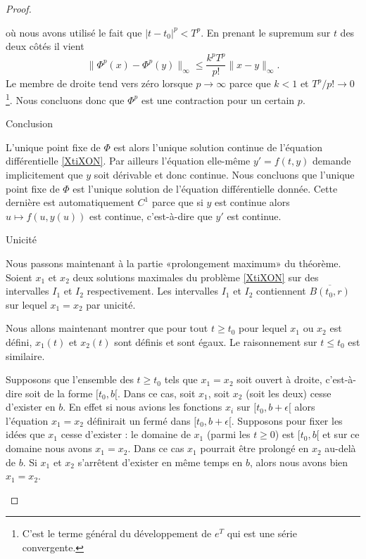 \begin{proof}
\begin{subproof}
\begin{equation}
		\end{equation}
		où nous avons utilisé le fait que \( | t-t_0 |^p<T^p\). En prenant le supremum sur \( t\) des deux côtés il vient
		\begin{equation}
			\| \Phi^p(x)-\Phi^p(y) \|_{\infty}\leq\frac{ k^pT^p }{ p! }\| x-y \|_{\infty}.
		\end{equation}
		Le membre de droite tend vers zéro lorsque \( p\to\infty\) parce que \( k<1\) et \( T^p/p!\to 0\)\footnote{C'est le terme général du développement de \(  e^{T}\) qui est une série convergente.}. Nous concluons donc que \( \Phi^p\) est une contraction pour un certain \( p\).

		\item[Conclusion]

		L'unique point fixe de \( \Phi\) est alors l'unique solution continue de l'équation différentielle \eqref{XtiXON}. Par ailleurs l'équation elle-même \( y'=f(t,y)\) demande implicitement que \( y\) soit dérivable et donc continue. Nous concluons que l'unique point fixe de \( \Phi\) est l'unique solution de l'équation différentielle donnée. Cette dernière est automatiquement \( C^1\) parce que si \( y\) est continue alors \( u\mapsto f(u,y(u))\) est continue, c'est-à-dire que \( y'\) est continue.

		\item[Unicité]

		Nous passons maintenant à la partie «prolongement maximum» du théorème. Soient \( x_1\) et \( x_2\) deux solutions maximales du problème \eqref{XtiXON} sur des intervalles \( I_1\) et \( I_2\) respectivement. Les intervalles \( I_1\) et \( I_2\) contiennent \( \overline{ B(t_0,r) }\) sur lequel \( x_1=x_2\) par unicité.

		Nous allons maintenant montrer que pour tout \( t\geq t_0\) pour lequel \( x_1\) ou \( x_2\) est défini, \( x_1(t)\) et \( x_2(t)\) sont définis et sont égaux. Le raisonnement sur \( t\leq t_0\) est similaire.

		Supposons que l'ensemble des \( t\geq t_0\) tels que \( x_1=x_2\) soit ouvert à droite, c'est-à-dire soit de la forme \( \mathopen[ t_0 ,b [\). Dans ce cas, soit \( x_1\), soit \( x_2\) (soit les deux) cesse d'exister en \( b\). En effet si nous avions les fonctions \( x_i\) sur \(\mathopen[ t_0 , b+\epsilon [\) alors l'équation \( x_1=x_2\) définirait un fermé dans \( \mathopen[ t_0 , b+\epsilon [\). Supposons pour fixer les idées que \( x_1\) cesse d'exister : le domaine de \( x_1\) (parmi les \( t\geq 0\)) est \( \mathopen[ t_0 , b [\) et sur ce domaine nous avons \( x_1=x_2\). Dans ce cas \( x_1\) pourrait être prolongé en \( x_2\) au-delà de \( b\). Si \( x_1\) et \( x_2\) s'arrêtent d'exister en même temps en \( b\), alors nous avons bien \( x_1=x_2\).


\end{subproof}
\end{proof}
